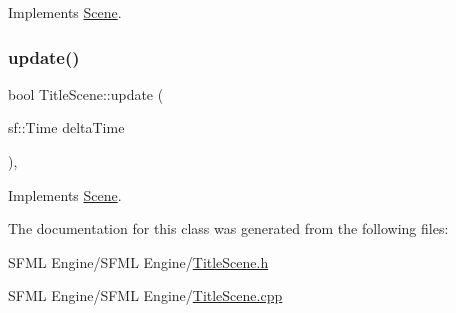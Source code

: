 Implements \hyperlink{class_scene_af25e4d2c998aca4e95899fb67488e815}{Scene}.

\hypertarget{class_title_scene_a17ce1b5b9f6f8ca44a6ed3326e9e5d0a}{}\label{class_title_scene_a17ce1b5b9f6f8ca44a6ed3326e9e5d0a} 
\subsubsection{\texorpdfstring{update()}{update()}}
{\footnotesize\ttfamily bool Title\+Scene\+::update (\begin{DoxyParamCaption}\item[{sf\+::\+Time}]{delta\+Time }\end{DoxyParamCaption})\hspace{0.3cm}{\ttfamily [override]}, {\ttfamily [virtual]}}



Implements \hyperlink{class_scene_a72683c984a1da2ce4f757705e93730f2}{Scene}.



The documentation for this class was generated from the following files\+:\begin{DoxyCompactItemize}
\item 
S\+F\+M\+L Engine/\+S\+F\+M\+L Engine/\hyperlink{_title_scene_8h}{Title\+Scene.\+h}\item 
S\+F\+M\+L Engine/\+S\+F\+M\+L Engine/\hyperlink{_title_scene_8cpp}{Title\+Scene.\+cpp}\end{DoxyCompactItemize}
